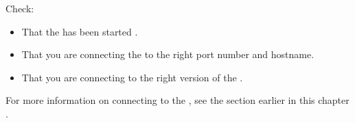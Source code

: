 


Check:
\begin{itemize}
\item That the \gdagent has been started .
\item That you are connecting the \gdagent to the right port number and \gdagent hostname. 
\item That you are connecting to the right version of the \gdagent. 
 
\end{itemize}

For more information on connecting to the \gdagent, see the section earlier in this chapter .

